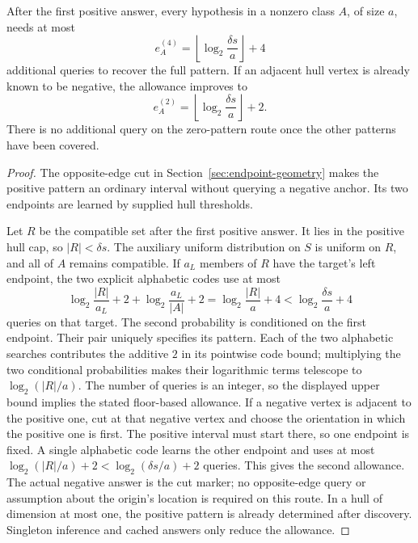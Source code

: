 \begin{lemma}\label{lem:endpoint-height}
After the first positive answer, every hypothesis in a nonzero
class $A$, of size $a$, needs at most
\[
 e_A^{(4)}=\left\lfloor\log_2\frac{\delta s}{a}\right\rfloor+4
\]
additional queries to recover the full pattern.
If an adjacent hull vertex is already known to be negative, the
allowance improves to
\[
 e_A^{(2)}=\left\lfloor\log_2\frac{\delta s}{a}\right\rfloor+2.
\]
There is no additional query on the zero-pattern route once the
other patterns have been covered.
\end{lemma}
\begin{proof}
The opposite-edge cut in Section~\ref{sec:endpoint-geometry} makes
the positive pattern an ordinary interval without querying a
negative anchor. Its two endpoints are learned by supplied hull
thresholds.

Let $R$ be the compatible set after the first positive answer.
It lies in the positive hull cap, so $|R|<\delta s$.
The auxiliary uniform distribution on $S$ is uniform on $R$,
and all of $A$ remains compatible.
If $a_L$ members of $R$ have the target's left endpoint, the two
explicit alphabetic codes use at most
\[
 \log_2\frac{|R|}{a_L}+2
 +\log_2\frac{a_L}{|A|}+2
 =\log_2\frac{|R|}{a}+4
 <\log_2\frac{\delta s}{a}+4
\]
queries on that target. The second probability is conditioned on
the first endpoint. Their pair uniquely specifies its pattern.
Each of the two alphabetic searches contributes the additive $2$
in its pointwise code bound; multiplying the two conditional
probabilities makes their logarithmic terms telescope to
$\log_2(|R|/a)$.
The number of queries is an integer, so the displayed upper bound
implies the stated floor-based allowance.
If a negative vertex is adjacent to the positive one, cut at that
negative vertex and choose the orientation in which the positive
one is first. The positive interval must start there, so one
endpoint is fixed. A single alphabetic code learns the other
endpoint and uses at most
$\log_2(|R|/a)+2<\log_2(\delta s/a)+2$ queries.
This gives the second allowance. The actual negative answer is
the cut marker; no opposite-edge query or assumption about the
origin's location is required on this route.
In a hull of dimension at most one, the positive pattern is already
determined after discovery.
Singleton inference and cached answers only reduce the allowance.
\end{proof}

